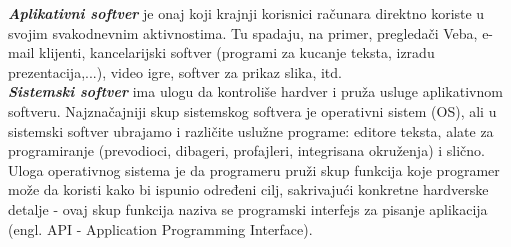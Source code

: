 \documentclass[a4paper]{article}
\begin{document}
{\begin{itemize}
\end{itemize}
\textbf{\em Aplikativni softver} je onaj koji krajnji korisnici računara direktno koriste u svojim svakodnevnim aktivnostima. Tu spadaju, na primer, pregledači Veba, e-mail klijenti, kancelarijski softver (programi za kucanje teksta, izradu prezentacija,...), video igre, softver za prikaz slika, itd.\\
\textbf{\em Sistemski softver} ima ulogu da kontroliše hardver i pruža usluge aplikativnom softveru. Najznačajniji skup sistemskog softvera je operativni sistem (OS), ali u sistemski softver ubrajamo i različite uslužne programe: editore teksta, alate za programiranje (prevodioci, dibageri, profajleri, integrisana okruženja) i slično. Uloga operativnog sistema je da programeru pruži skup funkcija koje programer može da koristi kako bi ispunio određeni cilj, sakrivajući konkretne hardverske detalje - ovaj skup funkcija naziva se programski interfejs za pisanje aplikacija (engl. API - Application Programming Interface).

}
\end{document}
